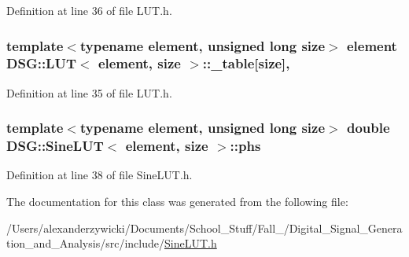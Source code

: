 Definition at line 36 of file L\+U\+T.\+h.

\hypertarget{classDSG_1_1LUT_ac8b23bbb7ce259d4ceb1c6fa93a7f29f}{
\subsubsection[{\+\_\+table}]{\setlength{\rightskip}{0pt plus 5cm}template$<$typename element, unsigned long size$>$ element {\bf D\+S\+G\+::\+L\+U\+T}$<$ element, size $>$\+::\+\_\+table\mbox{[}size\mbox{]}\hspace{0.3cm}{\ttfamily [protected]}, {\ttfamily [inherited]}}}\label{classDSG_1_1LUT_ac8b23bbb7ce259d4ceb1c6fa93a7f29f}


Definition at line 35 of file L\+U\+T.\+h.

\hypertarget{classDSG_1_1SineLUT_ae780e53f58e2c7dc0568ee96f2d5598b}{
\subsubsection[{phs}]{\setlength{\rightskip}{0pt plus 5cm}template$<$typename element, unsigned long size$>$ double {\bf D\+S\+G\+::\+Sine\+L\+U\+T}$<$ element, size $>$\+::phs\hspace{0.3cm}{\ttfamily [protected]}}}\label{classDSG_1_1SineLUT_ae780e53f58e2c7dc0568ee96f2d5598b}


Definition at line 38 of file Sine\+L\+U\+T.\+h.



The documentation for this class was generated from the following file\+:\begin{DoxyCompactItemize}
\item 
/\+Users/alexanderzywicki/\+Documents/\+School\+\_\+\+Stuff/\+Fall\+\_/\+Digital\+\_\+\+Signal\+\_\+\+Generation\+\_\+and\+\_\+\+Analysis/src/include/\hyperlink{SineLUT_8h}{Sine\+L\+U\+T.\+h}\end{DoxyCompactItemize}
